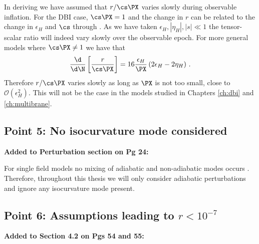 In deriving  we have assumed that $r/\cs \PX$ varies slowly during
observable inflation. For the DBI case, $\cs \PX = 1$ and the change in $r$ can be related to the
change in $\epsilon_H$ and $\cs$ through . As we have taken $\epsilon_H,
|\eta_H|,|s|\ll 1$ the tensor-scalar ratio will indeed vary slowly over the observable epoch.
% 
For more general models where $\cs \PX \ne 1$ we have that
% 
\begin{equation}
 \frac{\d }{\d \N}\left[ \frac{r}{\cs \PX}\right] = 16\frac{\epsilon_H}{\PX}\left( 2\epsilon_H
-2\eta_H\right)\,.
\end{equation}
% 
Therefore $r/\cs\PX$ varies slowly as long as $\PX$ is not too small, \iec close to
$\mathcal{O}(\epsilon_H^2)$. This will not be the case in the models studied in Chapters
\ref{ch:dbi} and \ref{ch:multibrane}.

\subsection{Point 5: No isocurvature mode considered}
\textbf{Added to Perturbation section on Pg 24:}

For single field models no mixing
of adiabatic and non-adiabatic modes occurs \cite{Weinberg200804}. Therefore, throughout this
thesis we will only consider adiabatic perturbations and ignore any isocurvature mode present.

\subsection{Point 6: Assumptions leading to \texorpdfstring{$r<10^{-7}$}{r<10**-7}}
\textbf{Added to Section 4.2 on Pgs 54 and 55:}


